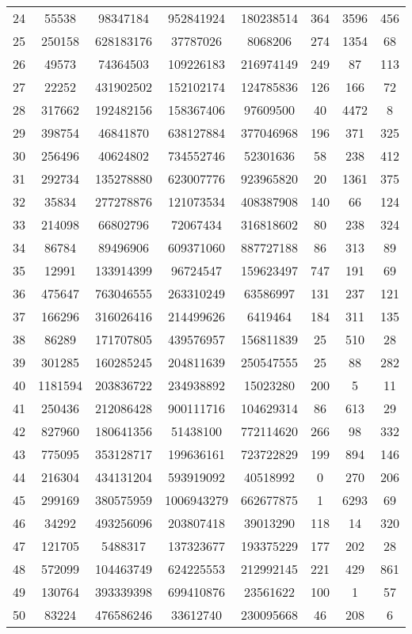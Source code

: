 \documentclass[solution, letterpaper]{cs121}
\begin{document}
\begin{center}
\begin{tabular}{ c |c c c c c c c}
24 & 55538 & 98347184 & 952841924 & 180238514 & 364 & 3596 & 456 \\
25 & 250158 & 628183176 & 37787026 & 8068206 & 274 & 1354 & 68 \\
26 & 49573 & 74364503 & 109226183 & 216974149 & 249 & 87 & 113 \\
27 & 22252 & 431902502 & 152102174 & 124785836 & 126 & 166 & 72 \\
28 & 317662 & 192482156 & 158367406 & 97609500 & 40 & 4472 & 8 \\
29 & 398754 & 46841870 & 638127884 & 377046968 & 196 & 371 & 325 \\
30 & 256496 & 40624802 & 734552746 & 52301636 & 58 & 238 & 412 \\
31 & 292734 & 135278880 & 623007776 & 923965820 & 20 & 1361 & 375 \\
32 & 35834 & 277278876 & 121073534 & 408387908 & 140 & 66 & 124 \\
33 & 214098 & 66802796 & 72067434 & 316818602 & 80 & 238 & 324 \\
34 & 86784 & 89496906 & 609371060 & 887727188 & 86 & 313 & 89 \\
35 & 12991 & 133914399 & 96724547 & 159623497 & 747 & 191 & 69 \\
36 & 475647 & 763046555 & 263310249 & 63586997 & 131 & 237 & 121 \\
37 & 166296 & 316026416 & 214499626 & 6419464 & 184 & 311 & 135 \\
38 & 86289 & 171707805 & 439576957 & 156811839 & 25 & 510 & 28 \\
39 & 301285 & 160285245 & 204811639 & 250547555 & 25 & 88 & 282 \\
40 & 1181594 & 203836722 & 234938892 & 15023280 & 200 & 5 & 11 \\
41 & 250436 & 212086428 & 900111716 & 104629314 & 86 & 613 & 29 \\
42 & 827960 & 180641356 & 51438100 & 772114620 & 266 & 98 & 332 \\
43 & 775095 & 353128717 & 199636161 & 723722829 & 199 & 894 & 146 \\
44 & 216304 & 434131204 & 593919092 & 40518992 & 0 & 270 & 206 \\
45 & 299169 & 380575959 & 1006943279 & 662677875 & 1 & 6293 & 69 \\
46 & 34292 & 493256096 & 203807418 & 39013290 & 118 & 14 & 320 \\
47 & 121705 & 5488317 & 137323677 & 193375229 & 177 & 202 & 28 \\
48 & 572099 & 104463749 & 624225553 & 212992145 & 221 & 429 & 861 \\
49 & 130764 & 393339398 & 699410876 & 23561622 & 100 & 1 & 57 \\
50 & 83224 & 476586246 & 33612740 & 230095668 & 46 & 208 & 6 \\


\end{tabular}
\end{center}
\end{document}
